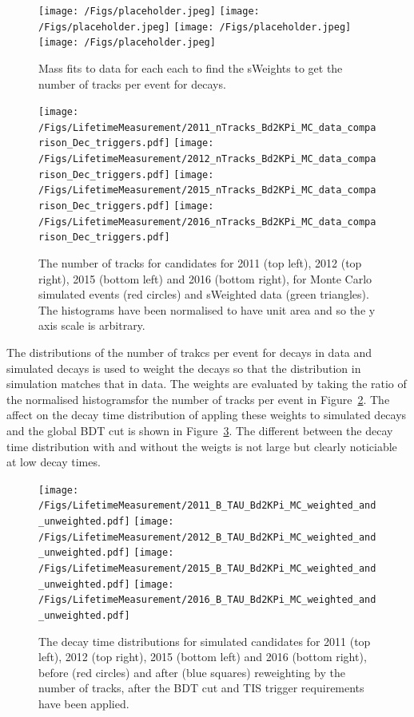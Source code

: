 \begin{figure}[ht]
  \centering
    \texttt{[image: /Figs/placeholder.jpeg]}
    \texttt{[image: /Figs/placeholder.jpeg]}
    \texttt{[image: /Figs/placeholder.jpeg]}
    \texttt{[image: /Figs/placeholder.jpeg]}
  \caption{Mass fits to \bdkpi data for each each to find the sWeights to get the number of tracks per event for \bdkpi decays.}
  \label{fig:ntracksmassifts}
\end{figure}
\FloatBarrier


\begin{figure}[ht]
  \centering
    \texttt{[image: /Figs/LifetimeMeasurement/2011\_nTracks\_Bd2KPi\_MC\_data\_comparison\_Dec\_triggers.pdf]}
    \texttt{[image: /Figs/LifetimeMeasurement/2012\_nTracks\_Bd2KPi\_MC\_data\_comparison\_Dec\_triggers.pdf]}
    \texttt{[image: /Figs/LifetimeMeasurement/2015\_nTracks\_Bd2KPi\_MC\_data\_comparison\_Dec\_triggers.pdf]}
    \texttt{[image: /Figs/LifetimeMeasurement/2016\_nTracks\_Bd2KPi\_MC\_data\_comparison\_Dec\_triggers.pdf]}
  \caption{The number of tracks for \bdkpi candidates for 2011 (top left), 2012 (top right), 2015 (bottom left) and 2016 (bottom right), for Monte Carlo simulated events (red circles) and sWeighted data (green triangles). The histograms have been normalised to have unit area and so the y axis scale is arbitrary.}
  \label{fig:nTracksMCDataComp}
\end{figure}
\FloatBarrier


The distributions of the number of trakcs per event for \bdkpi decays in data and simulated decays is used to weight the \bdkpi decays so that the distribution in simulation matches that in data. The weights are evaluated by taking the ratio of the normalised histogramsfor the number of tracks per event in Figure~\ref{fig:nTracksMCDataComp}. The affect on the decay time distribution of appling these weights to \bdkpi simulated decays and the global BDT cut is shown in Figure~\ref{fig:BdToKpi_weightDecayTime}. The different between the decay time distribution with and without the weigts is not large but clearly noticiable at low decay times. 

\begin{figure}[ht]
  \centering
    \texttt{[image: /Figs/LifetimeMeasurement/2011\_B\_TAU\_Bd2KPi\_MC\_weighted\_and\_unweighted.pdf]}
    \texttt{[image: /Figs/LifetimeMeasurement/2012\_B\_TAU\_Bd2KPi\_MC\_weighted\_and\_unweighted.pdf]}
    \texttt{[image: /Figs/LifetimeMeasurement/2015\_B\_TAU\_Bd2KPi\_MC\_weighted\_and\_unweighted.pdf]}
    \texttt{[image: /Figs/LifetimeMeasurement/2016\_B\_TAU\_Bd2KPi\_MC\_weighted\_and\_unweighted.pdf]}
  \caption{The decay time distributions for \bdkpi simulated candidates for 2011 (top left), 2012 (top right), 2015 (bottom left) and 2016 (bottom right), before (red circles) and after (blue squares) reweighting by the number of tracks, after the BDT cut and TIS trigger requirements have been applied.}
  \label{fig:BdToKpi_weightDecayTime}
\end{figure}


